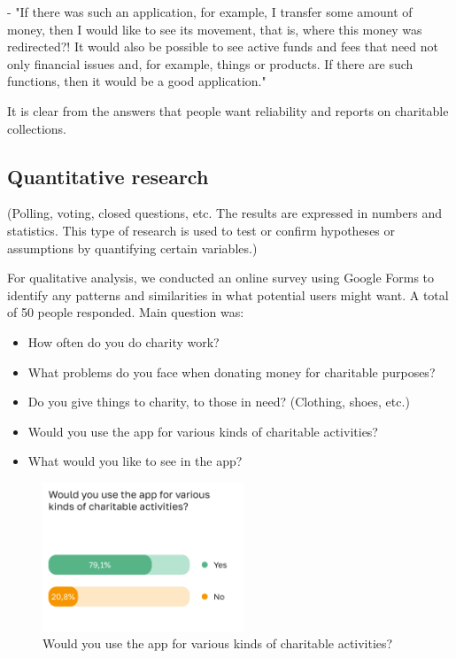 - "If there was such an application, for example, I transfer some amount of money, then I would like to see its movement, that is, where this money was redirected?! It would also be possible to see active funds and fees that need not only financial issues and, for example, things or products. If there are such functions, then it would be a good application."

It is clear from the answers that people want reliability and reports on charitable collections.

\subsection{Quantitative research}

(Polling, voting, closed questions, etc. The results are expressed in numbers and statistics. This type of research is used to test or confirm hypotheses or assumptions by quantifying certain variables.)

For qualitative analysis, we conducted an online survey using Google Forms to identify any patterns and similarities in what potential users might want. A total of 50 people responded. Main question was:
\begin{itemize}
    \item How often do you do charity work? 
    \item What problems do you face when donating money for charitable purposes?
    \item Do you give things to charity, to those in need? (Clothing, shoes, etc.) 
    \item Would you use the app for various kinds of charitable activities?
    \item What would you like to see in the app?
\end{itemize}

\begin{figure}[h]
    \centering
    \includegraphics[width=6cm]{figures/Questionaire9.png}
    \caption{Would you use the app for various kinds of charitable activities?}
    \label{fig:4}
\end{figure}

